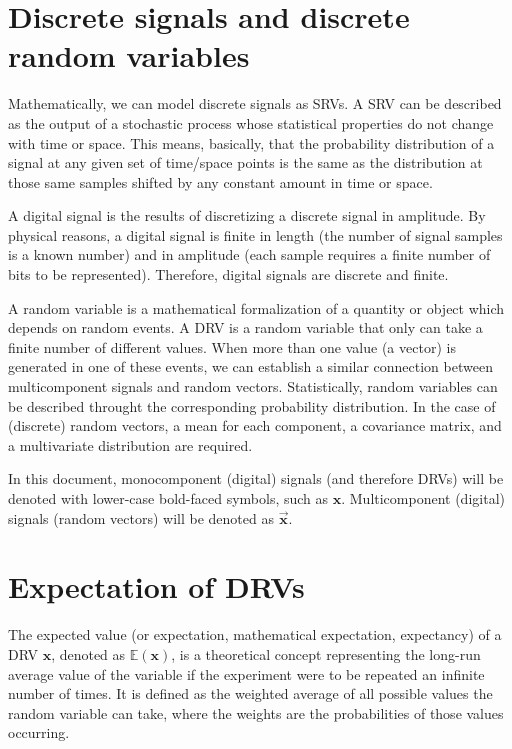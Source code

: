 \section{Discrete signals and discrete random variables}
\label{sec:DSRV}

Mathematically, we can model discrete signals as \glspl{SRV}. A
\gls{SRV} can be described as the output of a stochastic process whose
statistical properties do not change with time or space. This means,
basically, that the probability distribution of a signal at any given
set of time/space points is the same as the distribution at those same
samples shifted by any constant amount in time or space.

A digital signal is the results of discretizing a discrete signal in
amplitude. By physical reasons, a digital signal is finite in length
(the number of signal samples is a known number) and in amplitude
(each sample requires a finite number of bits to be
represented). Therefore, digital signals are discrete and finite.

A random variable is a mathematical formalization of a quantity or
object which depends on random events. A \gls{DRV} is a random
variable that only can take a finite number of different values. When
more than one value (a vector) is generated in one of these events, we
can establish a similar connection between multicomponent signals and
random vectors. Statistically, random variables can be described
throught the corresponding probability
distribution. In the case of (discrete) random vectors, a mean for each
component, a covariance matrix, and a multivariate distribution are
required.

In this document, monocomponent (digital) signals (and therefore
\glspl{DRV}) will be denoted with lower-case bold-faced symbols,
such as $\mathbf{x}$. Multicomponent (digital) signals (random
vectors) will be denoted as $\overrightarrow{\mathbf{x}}$.


\section{Expectation of \glspl{DRV}}
The expected value (or expectation, mathematical expectation,
expectancy) of a \gls{DRV} $\mathbf{x}$, denoted as
$\mathbb{E}(\mathbf{x})$, is a theoretical concept representing the
long-run average value of the variable if the experiment were to be
repeated an infinite number of times. It is defined as the weighted
average of all possible values the random variable can take, where the
weights are the probabilities of those values occurring.

